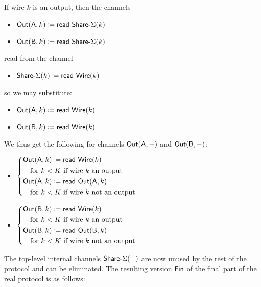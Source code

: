 If wire $k$ is an output, then the channels
\begin{itemize}
\item $\mathsf{Out}(\mathsf{A},k) \coloneqq \mathsf{read} \ \mathsf{Share}\textsf{-}\Sigma(k)$
\item $\mathsf{Out}(\mathsf{B},k) \coloneqq \mathsf{read} \ \mathsf{Share}\textsf{-}\Sigma(k)$
\end{itemize}
read from the channel
\begin{itemize}
\item $\mathsf{Share}\textsf{-}\Sigma(k) \coloneqq \mathsf{read} \ \mathsf{Wire}(k)$
\end{itemize}
so we may substitute:
\begin{itemize}
\item $\mathsf{Out}(\mathsf{A},k) \coloneqq \mathsf{read} \ \mathsf{Wire}(k)$
\item $\mathsf{Out}(\mathsf{B},k) \coloneqq \mathsf{read} \ \mathsf{Wire}(k)$
\end{itemize}
We thus get the following for channels $\mathsf{Out}(\mathsf{A},-)$ and $\mathsf{Out}(\mathsf{B},-)$:
\begin{itemize}
\item $\begin{cases*} \Out(\A,k) \coloneqq \read{\Wire(k)} \\ \hspace{10pt} \text{for $k < K$ if wire $k$ an output} \\ \Out(\A,k) \coloneqq \read{\Out(\A,k)} \\ \hspace{10pt} \text{for $k < K$ if wire $k$ not an output} \end{cases*}$
\item $\begin{cases*} \Out(\B,k) \coloneqq \read{\Wire(k)} \\ \hspace{10pt} \text{for $k < K$ if wire $k$ an output} \\ \Out(\B,k) \coloneqq \read{\Out(\B,k)} \\ \hspace{10pt} \text{for $k < K$ if wire $k$ not an output} \end{cases*}$
\end{itemize}
The top-level internal channels $\mathsf{Share}\textsf{-}\Sigma(-)$ are now unused by the rest of the protocol and can be eliminated. The resulting version $\mathsf{Fin}$ of the final part of the real protocol is as follows:

